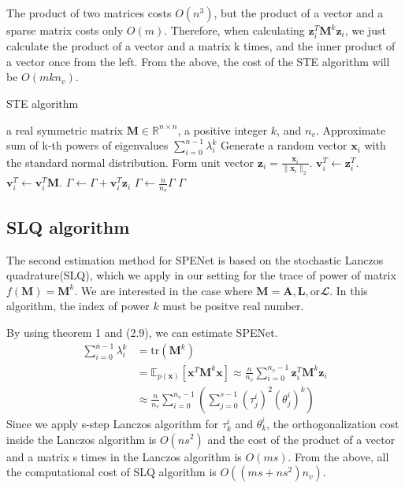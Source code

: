 \documentclass[senior,final,11pt]{iscs-thesis}
\begin{document}
The product of two matrices costs $O(n^3)$, but the product of a vector and a sparse matrix costs only $O(m)$. Therefore, when calculating $\mathbf{z}_i^{T}{\mathbf M}^k\mathbf{z}_i$, we just calculate the product of a vector and a matrix k times, and the inner product of a vector once from the left. From the above, the cost of the STE algorithm will be $O(mkn_v)$.

\begin{algorithm}
    \caption{STE algorithm}
    \begin{algorithmic}[1]
    \renewcommand{\algorithmicrequire}{\textbf{Input:}}
    \renewcommand{\algorithmicensure}{\textbf{Output:}}
    \REQUIRE a real symmetric matrix ${\mathbf M} \in {\mathbb R}^{n\times n}$, a positive integer $k$, and $n_v$.
    \ENSURE  Approximate sum of k-th powers of eigenvalues $\sum_{i=0}^{n-1} \lambda_i^k$
     \STATE Generate a random vector $\mathbf{x}_i$ with the standard normal distribution.
     \STATE Form unit vector $\mathbf{z}_i = \frac{\mathbf{x}_i}{\|\mathbf{x}_i\|_2}$.
     \STATE $\mathbf{v}_i^T \leftarrow \mathbf{z}_i^T $.
        \STATE $\mathbf{v}_i^T \leftarrow \mathbf{v}_i^T {\mathbf M}$.
        \ENDFOR
     \STATE $\Gamma \leftarrow \Gamma + \mathbf{v}_i^T \mathbf{z}_i$
     \ENDFOR
    \STATE $\Gamma \leftarrow \frac{n}{n_v}\Gamma$
    \RETURN $\Gamma$
    \end{algorithmic}
\end{algorithm}

\subsection{SLQ algorithm}
The second estimation method for SPENet is based on the stochastic Lanczos quadrature(SLQ), which we apply in our setting for the trace of power of matrix $f({\mathbf M})={\mathbf M}^k$. We are interested in the case where ${\mathbf M} = {\mathbf A}, {\mathbf L}, \text{or} {\mathbfcal L}$. In this algorithm, the index of power $k$ must be positve real number.

By using theorem 1 and (2.9), we can estimate SPENet.
\begin{align}
    \sum_{i=0}^{n-1} \lambda_i^k &= \mathrm{tr}({\mathbf M}^k)  \nonumber\\
    &= \mathbb{E}_{p(\mathbf{x})}[\mathbf{x}^{T}{\mathbf M}^k \mathbf{x}] \approx \frac{n}{n_v}\sum_{i=0}^{n_v-1} \mathbf{z}_i^{T}{\mathbf M}^k\mathbf{z}_i \nonumber\\
    &\approx \frac{n}{n_v} \sum_{i=0}^{n_v-1}\left(\sum_{j=0}^{s-1} (\tau_j^i)^2 (\theta_j^i)^k \right)
\end{align}
Since we apply s-step Lanczos algorithm for $\tau_k^i$ and $\theta_k^i$, the orthogonalization cost inside the Lanczos algorithm is $O(ns^2)$ and the cost of the product of a vector and a matrix s times in the Lanczos algorithm is $O(ms)$. From the above, all the computational cost of SLQ algorithm is $O((ms+ns^2)n_v)$.
\end{document}
